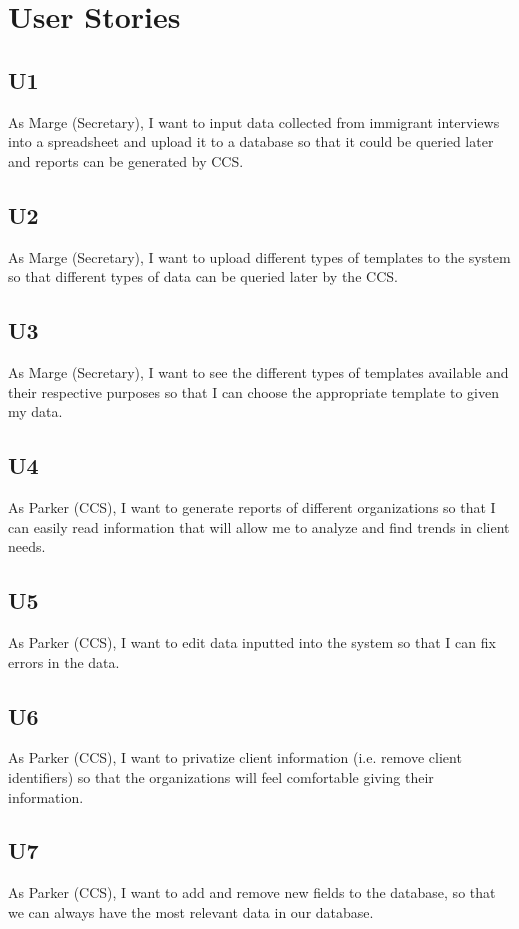 \documentclass[]{scrartcl}
\begin{document}
\section{User Stories}
\subsection{U1}
As Marge (Secretary), I want to input data collected from immigrant interviews into a spreadsheet and upload it to a database so that it could be queried later and reports can be generated by CCS.

\subsection{U2}
As Marge (Secretary), I want to upload different types of templates to the system so that different types of data can be queried later by the CCS.

\subsection{U3}
As Marge (Secretary), I want to see the different types of templates available and their respective purposes so that I can choose the appropriate template to given my data.

\subsection{U4}
As Parker (CCS), I want to generate reports of different organizations so that I can easily read information that will allow me to analyze and find trends in client needs.

\subsection{U5}
As Parker (CCS), I want to edit data inputted into the system so that I can fix errors in the data.

\subsection{U6}
As Parker (CCS), I want to privatize client information (i.e. remove client identifiers) so that the organizations will feel comfortable giving their information.

\subsection{U7}
As Parker (CCS), I want to add and remove new fields to the database, so that we can always have the most relevant data in our database.
\end{document}
